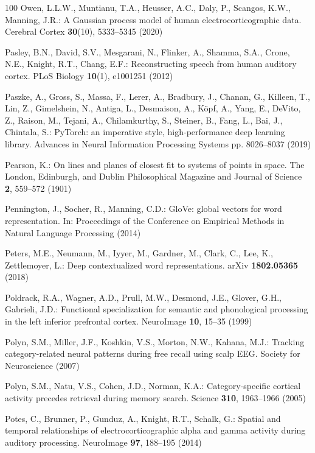 \documentclass{llmxive}
\begin{document}
\begin{thebibliography}{100}
Owen, L.L.W., Muntianu, T.A., Heusser, A.C., Daly, P., Scangos, K.W., Manning,
  J.R.: A {Gaussian} process model of human electrocorticographic data.
  Cerebral Cortex  \textbf{30}(10),  5333--5345 (2020)

Pasley, B.N., David, S.V., Mesgarani, N., Flinker, A., Shamma, S.A., Crone,
  N.E., Knight, R.T., Chang, E.F.: Reconstructing speech from human auditory
  cortex. {PLoS} Biology  \textbf{10}(1),  e1001251 (2012)

Paszke, A., Gross, S., Massa, F., Lerer, A., Bradbury, J., Chanan, G., Killeen,
  T., Lin, Z., Gimelshein, N., Antiga, L., Desmaison, A., K{\" o}pf, A., Yang,
  E., DeVito, Z., Raison, M., Tejani, A., Chilamkurthy, S., Steiner, B., Fang,
  L., Bai, J., Chintala, S.: {PyTorch}: an imperative style, high-performance
  deep learning library. Advances in Neural Information Processing Systems pp.
  8026--8037 (2019)

Pearson, K.: On lines and planes of closest fit to systems of points in space.
  The London, Edinburgh, and Dublin Philosophical Magazine and Journal of
  Science  \textbf{2},  559--572 (1901)

Pennington, J., Socher, R., Manning, C.D.: {GloVe}: global vectors for word
  representation. In: Proceedings of the Conference on Empirical Methods in
  Natural Language Processing (2014)

Peters, M.E., Neumann, M., Iyyer, M., Gardner, M., Clark, C., Lee, K.,
  Zettlemoyer, L.: Deep contextualized word representations. {arXiv}
  \textbf{1802.05365} (2018)

Poldrack, R.A., Wagner, A.D., Prull, M.W., Desmond, J.E., Glover, G.H.,
  Gabrieli, J.D.: Functional specialization for semantic and phonological
  processing in the left inferior prefrontal cortex. {NeuroImage}  \textbf{10},
   15--35 (1999)

Polyn, S.M., Miller, J.F., Koshkin, V.S., Morton, N.W., Kahana, M.J.: Tracking
  category-related neural patterns during free recall using scalp {EEG}.
  Society for Neuroscience (2007)

Polyn, S.M., Natu, V.S., Cohen, J.D., Norman, K.A.: Category-specific cortical
  activity precedes retrieval during memory search. Science  \textbf{310},
  1963--1966 (2005)

Potes, C., Brunner, P., Gunduz, A., Knight, R.T., Schalk, G.: Spatial and
  temporal relationships of electrocorticographic alpha and gamma activity
  during auditory processing. {NeuroImage}  \textbf{97},  188--195 (2014)


\end{thebibliography}
\end{document}
